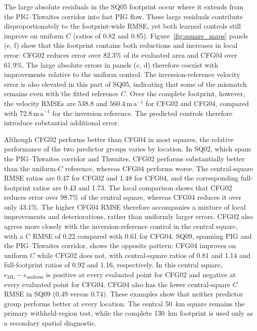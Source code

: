 \documentclass[review,jog]{igs}
\begin{document}
The large absolute residuals in the SQ05 footprint occur where it extends
from the PIG--Thwaites corridor into fast PIG flow. These large residuals
contribute disproportionately to the footprint-wide RMSE, yet both learned
controls still improve on uniform $C$ (ratios of 0.82 and 0.85).
Figure~\ref{fig:square_maps} panels (e, f) show that this footprint contains both reductions and
increases in local error: CFG02 reduces error over 82.3\% of its evaluated
area and CFG04 over 61.9\%. The large absolute errors in panels (c, d)
therefore coexist with improvements relative to the uniform control.
The inversion-reference velocity error is also elevated in this part of
SQ05, indicating that some of the mismatch remains even with the fitted
reference $C$. Over the complete footprint, however, the velocity RMSEs
are $538.8$ and $560.4\,\mathrm{m\,a^{-1}}$ for CFG02 and CFG04, compared
with $72.8\,\mathrm{m\,a^{-1}}$ for the inversion reference. The predicted
controls therefore introduce substantial additional error.

Although CFG02 performs better than CFG04 in most squares, the relative
performance of the two predictor groups varies by location. In SQ02,
which spans the PIG--Thwaites corridor and Thwaites, CFG02 performs
substantially better than the uniform-$C$ reference, whereas CFG04
performs worse. The central-square RMSE ratios are 0.47 for CFG02 and
1.48 for CFG04, and the corresponding full-footprint ratios are 0.43
and 1.73. The local comparison shows that CFG02 reduces error over
98.7\% of the central square, whereas CFG04 reduces it over only 43.1\%.
The higher CFG04 RMSE therefore accompanies a mixture of local
improvements and deteriorations, rather than uniformly larger errors.
CFG02 also agrees more closely with the inversion-reference control
in the central square, with a $C$ RMSE of 0.22 compared with 0.61 for
CFG04. SQ09, spanning PIG and the PIG--Thwaites corridor, shows the
opposite pattern: CFG04 improves on uniform $C$ while CFG02 does not,
with central-square ratios of 0.81 and 1.14 and full-footprint ratios
of 0.92 and 1.16, respectively. In this central square,
$e_{\mathrm{ML}}-e_{\mathrm{uniform}}$ is positive at every evaluated
point for CFG02 and negative at every evaluated point for CFG04.
CFG04 also has the lower central-square $C$ RMSE in SQ09
(0.49 versus 0.74). These examples show that neither predictor group
performs better at every location. The central 50~km square remains
the primary withheld-region test, while the complete 130~km footprint
is used only as a secondary spatial diagnostic.
\end{document}
